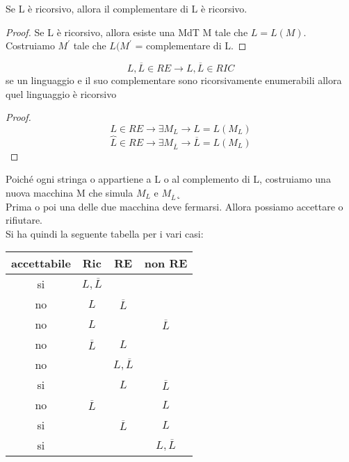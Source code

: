 \documentclass[a4paper,12pt, oneside]{book}
\begin{document}
\begin{teorema}
Se L è ricorsivo, allora il complementare di L è ricorsivo.
\end{teorema}
\begin{proof}
Se L è ricorsivo, allora esiste una MdT M tale che $L = L(M)$. Costruiamo $M^{'}$ tale che
$L(M^{'}$ = complementare di L.
\end{proof}
\begin{teorema}
$$L,\overline{L}\in RE\to L,\overline{L}\in RIC$$
se un linguaggio e il suo complementare sono ricorsivamente enumerabili allora quel linguaggio è ricorsivo
\end{teorema}
\begin{proof}
$$L\in RE\to \exists M_L\to L=L(M_L)$$
$$\overbrace{L}\in RE\to \exists M_{\overline{L}}\to \overline{L}=L(M_L)$$
\end{proof}
Poiché ogni stringa o appartiene a L o al complemento di L, costruiamo una nuova macchina M che
simula $M_L$ e $M_{\overline{L}}$˛\\Prima o poi una delle due macchina deve fermarsi. Allora possiamo accettare o rifiutare.\\
Si ha quindi la seguente tabella per i vari casi:
\begin{center}
\begin{tabular}{c c c c }
accettabile & Ric & RE & non RE\\
\hline
si & $L,\overline{L}$ & & \\
no & $L$ & $\overline{L}$ & \\
no & $L$ & & $\overline{L}$ \\
no & $\overline{L}$ & $L$ & \\
no &  & $L,\overline{L}$ & \\
si &  & $L$ & $\overline{L}$ \\
no & $\overline{L}$ & &$L$ \\
si & & $\overline{L}$ & $L$ \\
si &  & & $L,\overline{L}$\\
\end{tabular}
\end{center}
\end{document}
